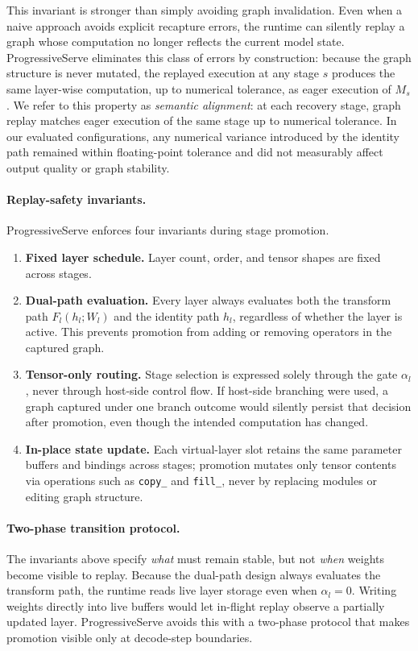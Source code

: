 \documentclass[sigplan,anonymous,review,nonacm]{acmart}
\begin{document}
This invariant is stronger than simply avoiding graph invalidation. Even when a naive approach avoids explicit recapture errors, the runtime can silently replay a graph whose computation no longer reflects the current model state. ProgressiveServe eliminates this class of errors by construction: because the graph structure is never mutated, the replayed execution at any stage $s$ produces the same layer-wise computation, up to numerical tolerance, as eager execution of $M_s$. We refer to this property as \emph{semantic alignment}: at each recovery stage, graph replay matches eager execution of the same stage up to numerical tolerance. In our evaluated configurations, any numerical variance introduced by the identity path remained within floating-point tolerance and did not measurably affect output quality or graph stability.

\paragraph{Replay-safety invariants.}
ProgressiveServe enforces four invariants during stage promotion.
\begin{enumerate}
    \item \textbf{Fixed layer schedule.} Layer count, order, and tensor shapes are fixed across stages.
    \item \textbf{Dual-path evaluation.} Every layer always evaluates both the transform path $F_l(h_l; W_l)$ and the identity path $h_l$, regardless of whether the layer is active. This prevents promotion from adding or removing operators in the captured graph.
    \item \textbf{Tensor-only routing.} Stage selection is expressed solely through the gate $\alpha_l$, never through host-side control flow. If host-side branching were used, a graph captured under one branch outcome would silently persist that decision after promotion, even though the intended computation has changed.
    \item \textbf{In-place state update.} Each virtual-layer slot retains the same parameter buffers and bindings across stages; promotion mutates only tensor contents via operations such as \texttt{copy\_} and \texttt{fill\_}, never by replacing modules or editing graph structure.
\end{enumerate}

\paragraph{Two-phase transition protocol.}
The invariants above specify \emph{what} must remain stable, but not \emph{when} weights become visible to replay. Because the dual-path design always evaluates the transform path, the runtime reads live layer storage even when $\alpha_l = 0$. Writing weights directly into live buffers would let in-flight replay observe a partially updated layer. ProgressiveServe avoids this with a two-phase protocol that makes promotion visible only at decode-step boundaries.
\end{document}
